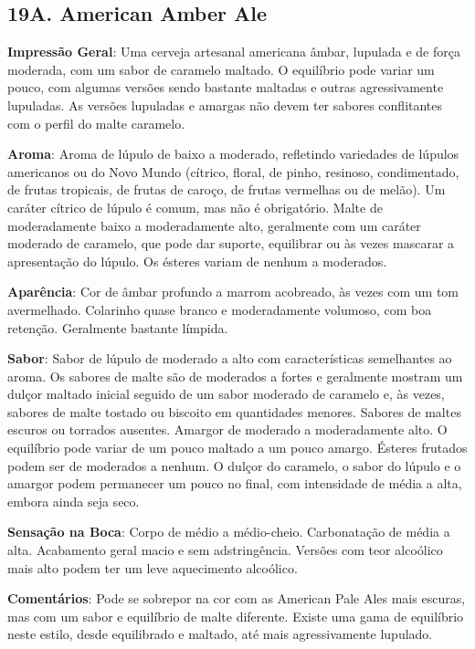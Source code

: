 \subsection*{19A. American Amber Ale}
\textbf{Impressão Geral}: Uma cerveja artesanal americana âmbar, lupulada e de força moderada, com um sabor de caramelo maltado. O equilíbrio pode variar um pouco, com algumas versões sendo bastante maltadas e outras agressivamente lupuladas. As versões lupuladas e amargas não devem ter sabores conflitantes com o perfil do malte caramelo.

\textbf{Aroma}: Aroma de lúpulo de baixo a moderado, refletindo variedades de lúpulos americanos ou do Novo Mundo (cítrico, floral, de pinho, resinoso, condimentado, de frutas tropicais, de frutas de caroço, de frutas vermelhas ou de melão). Um caráter cítrico de lúpulo é comum, mas não é obrigatório. Malte de moderadamente baixo a moderadamente alto, geralmente com um caráter moderado de caramelo, que pode dar suporte, equilibrar ou às vezes mascarar a apresentação do lúpulo. Os ésteres variam de nenhum a moderados.

\textbf{Aparência}: Cor de âmbar profundo a marrom acobreado, às vezes com um tom avermelhado. Colarinho quase branco e moderadamente volumoso, com boa retenção. Geralmente bastante límpida.

\textbf{Sabor}: Sabor de lúpulo de moderado a alto com características semelhantes ao aroma. Os sabores de malte são de moderados a fortes e geralmente mostram um dulçor maltado inicial seguido de um sabor moderado de caramelo e, às vezes, sabores de malte tostado ou biscoito em quantidades menores. Sabores de maltes escuros ou torrados ausentes. Amargor de moderado a moderadamente alto. O equilíbrio pode variar de um pouco maltado a um pouco amargo. Ésteres frutados podem ser de moderados a nenhum. O dulçor do caramelo, o sabor do lúpulo e o amargor podem permanecer um pouco no final, com intensidade de média a alta, embora ainda seja seco.

\textbf{Sensação na Boca}: Corpo de médio a médio-cheio. Carbonatação de média a alta. Acabamento geral macio e sem adstringência. Versões com teor alcoólico mais alto podem ter um leve aquecimento alcoólico.

\textbf{Comentários}: Pode se sobrepor na cor com as American Pale Ales mais escuras, mas com um sabor e equilíbrio de malte diferente. Existe uma gama de equilíbrio neste estilo, desde equilibrado e maltado, até mais agressivamente lupulado.

